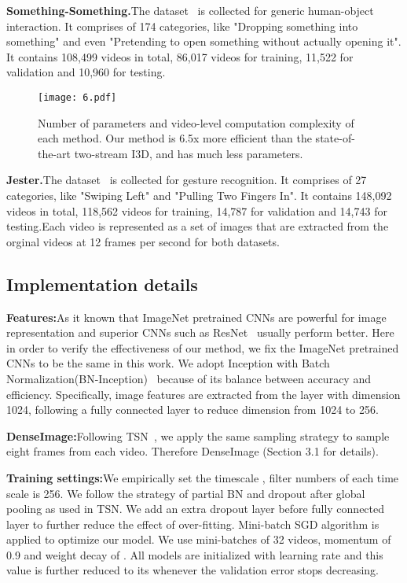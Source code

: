 \documentclass{article}
\begin{document}
\textbf{Something-Something.}The dataset~\cite{GoyalKMMWKHFYMH17} is collected for generic human-object interaction. It comprises of 174 categories, like "Dropping something into something" and even "Pretending to open something without actually opening it". It contains 108,499 videos in total, 86,017 videos for training, 11,522 for validation and 10,960 for testing.
\begin{figure*}[t]
	\begin{center}
		\texttt{[image: 6.pdf]}
		\caption{Number of parameters and video-level computation complexity of each method. Our method is 6.5x more efficient than the state-of-the-art two-stream I3D, and has much less parameters.}
		\label{Figure 5.}
	\end{center}
	\vspace{-0.5em}
\end{figure*}

\textbf{Jester.}The dataset~\cite{jester} is collected for gesture recognition. It comprises of 27 categories, like "Swiping Left" and "Pulling Two Fingers In". It contains 148,092 videos in total, 118,562 videos for training, 14,787 for validation and 14,743 for testing.Each video is represented as a set of images that are extracted from the orginal videos at 12 frames per second for both datasets.

\subsection{Implementation details}

\textbf{Features:}As it known that ImageNet pretrained CNNs are powerful for image representation and superior CNNs such as ResNet~\cite{HeZRS16} usually perform better. Here in order to verify the effectiveness of our method, we fix the ImageNet pretrained CNNs to be the same in this work. We adopt Inception with Batch Normalization(BN-Inception)~\cite{IoffeS15} because of its balance between accuracy and efficiency. Specifically, image features are extracted from the  layer with dimension 1024, following a fully connected layer to reduce dimension from 1024 to 256.

\textbf{DenseImage:}Following TSN~\cite{WangXW0LTG16}, we apply the same sampling strategy to sample eight frames from each video. Therefore DenseImage  (Section 3.1 for details).

\textbf{Training settings:}We empirically set the timescale , filter numbers of each time scale is 256. We follow the strategy of partial BN and dropout after global pooling as used in TSN. We add an extra dropout layer before fully connected layer to further reduce the effect of over-fitting. Mini-batch SGD algorithm is applied to optimize our model. We use mini-batches of 32 videos, momentum of 0.9 and weight decay of . All models are initialized with learning rate  and this value is further reduced to its  whenever the validation error stops decreasing.
\end{document}
